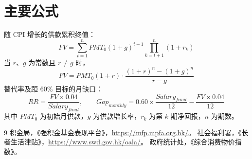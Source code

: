 \documentclass[12pt, letterpaper]{ctexart}
\begin{document}
\section*{主要公式}

随 CPI 增长的供款累积终值：
\begin{equation}
  FV = \sum_{t=1}^{n} PMT_0 (1+g)^{t-1} \prod_{k=t+1}^{n}(1+r_k)
\end{equation}
当 $r$、$g$ 为常数且 $r \neq g$ 时，
\begin{equation}
  FV = PMT_0 (1+r) \cdot \frac{(1+r)^n - (1+g)^n}{r - g}
\end{equation}
替代率及距 60\% 目标的月缺口：
\begin{equation}
  RR = \frac{FV \times 0.04}{Salary_{final}}, \qquad
  Gap_{monthly} = 0.60 \times \frac{Salary_{final}}{12} - \frac{FV \times 0.04}{12}
\end{equation}
其中 $PMT_0$ 为初始月供款，$g$ 为供款增长率，$r_k$ 为第 $k$ 期净回报，$n$ 为期数。

\begin{thebibliography}{9}
   积金局，《强积金基金表现平台》，\url{https://mfp.mpfa.org.hk/}。
   社会福利署，《长者生活津贴》，\url{https://www.swd.gov.hk/oala/}。
   政府统计处，《综合消费物价指数》。
\end{thebibliography}
\end{document}
